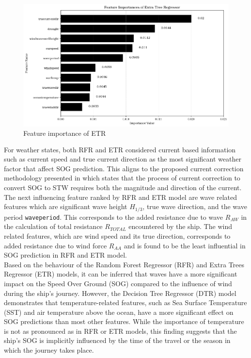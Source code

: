 \begin{figure}[h]
    \centering
        \includegraphics[width=.9\textwidth]{02_figures/etr_ftr_importance_nodir.png}
        \caption{Feature importance of ETR}
        \label{fig:ftr_impo_etr}
\end{figure}

For weather states, both RFR and ETR considered current based information such as current speed and true current direction as the most significant weather factor that affect SOG prediction. This aligns to the proposed current correction methodology presented in  which states that the process of current correction to convert SOG to STW requires both the magnitude and direction of the current. The next influencing feature ranked by RFR and ETR model are wave related features which are significant wave height $H_{1/3}$, true wave direction, and the wave period {\tt waveperiod}. This corresponds to the added resistance due to wave $R_{AW}$ in the calculation of total resistance $R_{TOTAL}$ encountered by the ship. The wind related features, which are wind speed and its true direction, corresponds to added resistance due to wind force $R_{AA}$ and is found to be the least influential in SOG prediction in RFR and ETR model.\\

Based on the behaviour of the Random Forest Regressor (RFR) and Extra Trees Regressor (ETR) models, it can be inferred that waves have a more significant impact on the Speed Over Ground (SOG) compared to the influence of wind during the ship's journey. However, the Decision Tree Regressor (DTR) model demonstrates that temperature-related features, such as Sea Surface Temperature (SST) and air temperature above the ocean, have a more significant effect on SOG predictions than most other features. While the importance of temperature is not as pronounced as in RFR or ETR models, this finding suggests that the ship's SOG is implicitly influenced by the time of the travel or the season in which the journey takes place.\\

